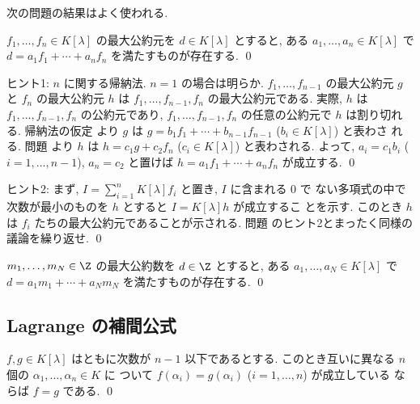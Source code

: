 \documentclass[12pt,twoside]{jarticle}
\begin{document}
\bigskip

{\Large 次の問題の結果はよく使われる.

\begin{question}
\label{q:Euclidean-algorithm-3}
  $f_1,\dots,f_n\in K[\lambda]$ の最大公約元を $d\in K[\lambda]$ とすると,
  ある $a_1,\dots,a_n\in K[\lambda]$ 
  で $d=a_1f_1+\cdots+a_nf_n$ を満たすものが存在する. \qed
\end{question}
}

\noindent
ヒント1: $n$ に関する帰納法.  $n=1$ の場合は明らか. 
$f_1,\dots,f_{n-1}$ の最大公約元 $g$ と $f_n$ の最大公約元 $h$ 
は $f_1,\dots,f_{n-1},f_n$ の最大公約元である. 
実際, $h$ は $f_1,\dots,f_{n-1},f_n$ の公約元であり, 
$f_1,\dots,f_{n-1},f_n$ の任意の公約元で $h$ は割り切れる.  帰納法の仮定
より $g$ は $g=b_1f_1+\cdots+b_{n-1}f_{n-1}$ ($b_i\in K[\lambda]$) と表わさ
れる. 問題  より $h$ は $h=c_1g+c_2f_n$ 
($c_i\in K[\lambda]$) と表わされる.  よって, $a_i=c_1b_i$ ($i=1,\dots,n-1$), 
$a_n=c_2$ と置けば $h = a_1f_1+\cdots+a_nf_n$ が成立する.
\qed

\medskip
\noindent
ヒント2: まず, $I=\sum_{i=1}^n K[\lambda]f_i$ と置き, $I$ に含まれる $0$ で
ない多項式の中で次数が最小のものを $h$ とすると $I=K[\lambda]h$ が成立するこ
とを示す.  このとき $h$ は $f_i$ たちの最大公約元であることが示される.
問題  のヒント2とまったく同様の議論を繰り返せ.
\qed


\begin{question}
\label{q:Euclidean-algorithm-3-Z}
  $m_1,\dots,m_N\in\Z$ の最大公約数を $d\in\Z$ とすると,
  ある $a_1,\dots,a_N\in K[\lambda]$ 
  で $d=a_1m_1+\cdots+a_Nm_N$ を満たすものが存在する. \qed
\end{question}


\subsection{Lagrange の補間公式}
\label{sec:Lagrange-interpolation}


\begin{question}
\label{q:Lagrange-interpolation-0}
  $f,g\in K[\lambda]$ はともに次数が $n-1$ 以下であるとする.
  このとき互いに異なる $n$ 個の $\alpha_1,\dots,\alpha_n\in K$ に
  ついて $f(\alpha_i)=g(\alpha_i)$ ($i=1,\dots,n$) が成立している
  ならば $f=g$ である. 
  \qed
\end{question}
\end{document}
